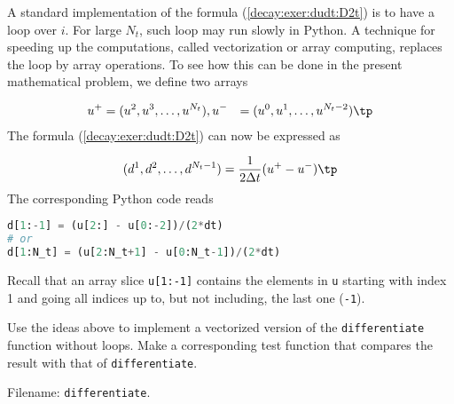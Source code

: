 \documentclass[graybox,sectrefs,envcountresetchap,open=right,final]{svmonodo}
\newenvironment{doconceexercise}{}{}
\begin{document}
\begin{doconceexercise}
A standard implementation of the formula (\ref{decay:exer:dudt:D2t}) is to
have a loop over $i$. For large $N_t$, such loop may run slowly in
Python. A technique for speeding up the computations, called vectorization
or array computing,
replaces the loop by array operations. To see how this can be done in
the present mathematical problem, we
define two arrays

\begin{align*}
u^+ &= (u^2,u^3,\ldots,u^{N_t}),
u^- &= (u^0,u^1,\ldots,u^{N_t-2})\tp
\end{align*}
The formula (\ref{decay:exer:dudt:D2t}) can now be expressed as

\[ (d^1,d^2,\ldots,d^{N_t-1}) = \frac{1}{2\Delta t}(u^+ - u^-)\tp\]
The corresponding Python code reads





\begin{lstlisting}[language=python,style=blue1_bluegreen]
d[1:-1] = (u[2:] - u[0:-2])/(2*dt)
# or
d[1:N_t] = (u[2:N_t+1] - u[0:N_t-1])/(2*dt)

\end{lstlisting}

Recall that an array slice \texttt{u[1:-1]} contains the elements in \texttt{u} starting
with index 1 and going all indices up to, but not including, the last one
(\texttt{-1}).

Use the ideas above to implement a vectorized version of the
\texttt{differentiate} function without loops. Make a corresponding
test function that compares the result with that of
\texttt{differentiate}.



\noindent Filename: \texttt{differentiate}.

\end{doconceexercise}
\end{document}
